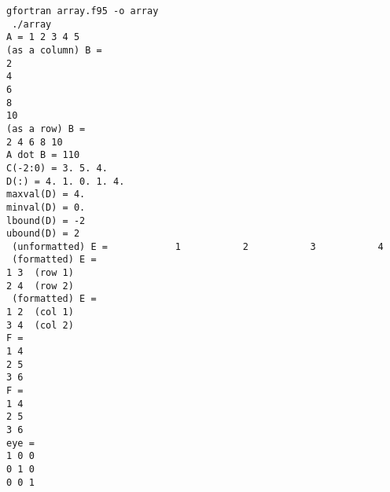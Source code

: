 \begin{Verbatim}[frame=lines,label=array - commands and output]
 gfortran array.f95 -o array
 ./array
A = 1 2 3 4 5
(as a column) B =
2
4
6
8
10
(as a row) B =
2 4 6 8 10
A dot B = 110
C(-2:0) = 3. 5. 4.
D(:) = 4. 1. 0. 1. 4.
maxval(D) = 4.
minval(D) = 0.
lbound(D) = -2
ubound(D) = 2
 (unformatted) E =            1           2           3           4
 (formatted) E = 
1 3  (row 1)
2 4  (row 2)
 (formatted) E = 
1 2  (col 1)
3 4  (col 2)
F = 
1 4
2 5
3 6
F = 
1 4
2 5
3 6
eye = 
1 0 0
0 1 0
0 0 1
\end{Verbatim}
